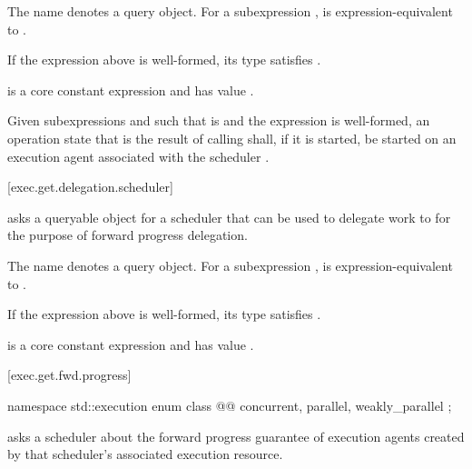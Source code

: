 \pnum
The name  denotes a query object.
For a subexpression ,
 is expression-equivalent to
.

\mandates
If the expression above is well-formed,
its type satisfies .

\pnum
{}
is a core constant expression and has value .

\pnum
Given subexpressions  and 
such that  is 
and the expression  is well-formed,
an operation state that is the result of calling 
shall, if it is started, be started on an execution agent
associated with the scheduler .

[exec.get.delegation.scheduler]{}

\pnum
{} asks a queryable object for a scheduler
that can be used to delegate work to
for the purpose of forward progress delegation.

\pnum
The name  denotes a query object.
For a subexpression ,
 is expression-equivalent to
.

\mandates
If the expression above is well-formed,
its type satisfies .

\pnum
{} is
a core constant expression and has value .

[exec.get.fwd.progress]{}

\begin{codeblock}
namespace std::execution {
  enum class @@ {
    concurrent,
    parallel,
    weakly_parallel
  };
}
\end{codeblock}

\pnum
{} asks a scheduler about
the forward progress guarantee of execution agents
created by that scheduler's associated execution resource.

